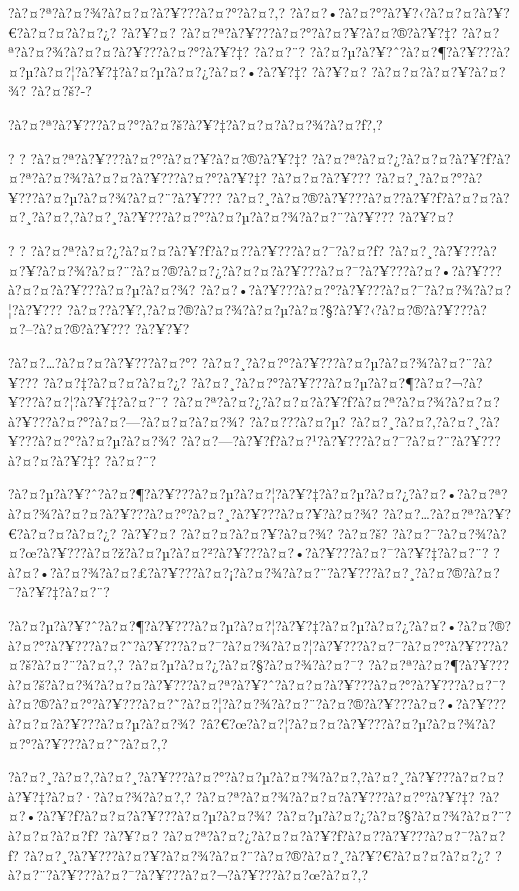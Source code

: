 \documentclass[11pt, openany]{book}
\begin{document}
{{{{{{{{{{{{{{{{?à?¤?ª?à?¤?¾?à?¤?¤?à?¥???à?¤?°?à?¤?‚?
?à?¤?•?à?¤?°?à?¥?‹?à?¤?¤?à?¥?€?à?¤?¤?à?¤?¿? ?à?¥?¤?
?à?¤?ª?à?¥???à?¤?°?à?¤?¥?à?¤?®?à?¥?‡?
?à?¤?ª?à?¤?¾?à?¤?¤?à?¥???à?¤?°?à?¥?‡? ?à?¤?¨?
?à?¤?µ?à?¥?ˆ?à?¤?¶?à?¥???à?¤?µ?à?¤?¦?à?¥?‡?à?¤?µ?à?¤?¿?à?¤?•?à?¥?‡?
?à?¥?¤? ?à?¤?¤?à?¤?¥?à?¤?¾? ?à?¤?š?-?

?à?¤?ª?à?¥???à?¤?°?à?¤?š?à?¥?‡?à?¤?¤?à?¤?¾?à?¤?ƒ?,?

? ? ?à?¤?ª?à?¥???à?¤?°?à?¤?¥?à?¤?®?à?¥?‡?
?à?¤?ª?à?¤?¿?à?¤?¤?à?¥?ƒ?à?¤?ª?à?¤?¾?à?¤?¤?à?¥???à?¤?°?à?¥?‡?
?à?¤?¤?à?¥??? ?à?¤?¸?à?¤?°?à?¥???à?¤?µ?à?¤?¾?à?¤?¨?à?¥???
?à?¤?¸?à?¤?®?à?¥???à?¤?­?à?¥?ƒ?à?¤?¤?à?¤?¸?à?¤?‚?à?¤?¸?à?¥???à?¤?°?à?¤?µ?à?¤?¾?à?¤?¨?à?¥???
?à?¥?¤?

? ? ?à?¤?ª?à?¤?¿?à?¤?¤?à?¥?ƒ?à?¤?­?à?¥???à?¤?¯?à?¤?ƒ?
?à?¤?¸?à?¥???à?¤?¥?à?¤?¾?à?¤?¨?à?¤?®?à?¤?¿?à?¤?¤?à?¥???à?¤?¯?à?¥???à?¤?•?à?¥???à?¤?¤?à?¥???à?¤?µ?à?¤?¾?
?à?¤?•?à?¥???à?¤?°?à?¥???à?¤?¯?à?¤?¾?à?¤?¦?à?¥???
?à?¤?­?à?¥?‚?à?¤?®?à?¤?¾?à?¤?µ?à?¤?§?à?¥?‹?à?¤?®?à?¥???à?¤?--?à?¤?®?à?¥???
?à?¥?¥?

?à?¤?\ldots{}?à?¤?¤?à?¥???à?¤?°?
?à?¤?¸?à?¤?°?à?¥???à?¤?µ?à?¤?¾?à?¤?¨?à?¥??? ?à?¤?‡?à?¤?¤?à?¤?¿?
?à?¤?¸?à?¤?°?à?¥???à?¤?µ?à?¤?¶?à?¤?¬?à?¥???à?¤?¦?à?¥?‡?à?¤?¨?
?à?¤?ª?à?¤?¿?à?¤?¤?à?¥?ƒ?à?¤?ª?à?¤?¾?à?¤?¤?à?¥???à?¤?°?à?¤?---?à?¤?¤?à?¤?¾?
?à?¤???à?¤?µ? ?à?¤?¸?à?¤?‚?à?¤?¸?à?¥???à?¤?°?à?¤?µ?à?¤?¾?
?à?¤?---?à?¥?ƒ?à?¤?¹?à?¥???à?¤?¯?à?¤?¨?à?¥???à?¤?¤?à?¥?‡? ?à?¤?¨?

?à?¤?µ?à?¥?ˆ?à?¤?¶?à?¥???à?¤?µ?à?¤?¦?à?¥?‡?à?¤?µ?à?¤?¿?à?¤?•?à?¤?ª?à?¤?¾?à?¤?¤?à?¥???à?¤?°?à?¤?¸?à?¥???à?¤?¥?à?¤?¾?
?à?¤?\ldots{}?à?¤?ª?à?¥?€?à?¤?¤?à?¤?¿? ?à?¥?¤? ?à?¤?¤?à?¤?¥?à?¤?¾?
?à?¤?š?
?à?¤?¯?à?¤?¾?à?¤?œ?à?¥???à?¤?ž?à?¤?µ?à?¤?²?à?¥???à?¤?•?à?¥???à?¤?¯?à?¥?‡?à?¤?¨?
?à?¤?•?à?¤?¾?à?¤?£?à?¥???à?¤?¡?à?¤?¾?à?¤?¨?à?¥???à?¤?¸?à?¤?®?à?¤?¯?à?¥?‡?à?¤?¨?

?à?¤?µ?à?¥?ˆ?à?¤?¶?à?¥???à?¤?µ?à?¤?¦?à?¥?‡?à?¤?µ?à?¤?¿?à?¤?•?à?¤?®?à?¤?°?à?¥???à?¤?˜?à?¥???à?¤?¯?à?¤?¾?à?¤?¦?à?¥???à?¤?¯?à?¤?°?à?¥???à?¤?š?à?¤?¨?à?¤?‚?
?à?¤?µ?à?¤?¿?à?¤?§?à?¤?¾?à?¤?¯?
?à?¤?ª?à?¤?¶?à?¥???à?¤?š?à?¤?¾?à?¤?¤?à?¥???à?¤?ª?à?¥?ˆ?à?¤?¤?à?¥???à?¤?°?à?¥???à?¤?¯?à?¤?®?à?¤?°?à?¥???à?¤?˜?à?¤?¦?à?¤?¾?à?¤?¨?à?¤?®?à?¥???à?¤?•?à?¥???à?¤?¤?à?¥???à?¤?µ?à?¤?¾?
?â?€?œ?à?¤?¦?à?¤?¤?à?¥???à?¤?µ?à?¤?¾?à?¤?°?à?¥???à?¤?˜?à?¤?‚?

?à?¤?¸?à?¤?‚?à?¤?¸?à?¥???à?¤?°?à?¤?µ?à?¤?¾?à?¤?‚?à?¤?¸?à?¥???à?¤?¤?à?¥?‡?à?¤?·?à?¤?¾?à?¤?‚?
?à?¤?ª?à?¤?¾?à?¤?¤?à?¥???à?¤?°?à?¥?‡?
?à?¤?•?à?¥?ƒ?à?¤?¤?à?¥???à?¤?µ?à?¤?¾?
?à?¤?µ?à?¤?¿?à?¤?§?à?¤?¾?à?¤?¨?à?¤?¤?à?¤?ƒ? ?à?¥?¤?
?à?¤?ª?à?¤?¿?à?¤?¤?à?¥?ƒ?à?¤?­?à?¥???à?¤?¯?à?¤?ƒ?
?à?¤?¸?à?¥???à?¤?¥?à?¤?¾?à?¤?¨?à?¤?®?à?¤?¸?à?¥?€?à?¤?¤?à?¤?¿?
?à?¤?¨?à?¥???à?¤?¯?à?¥???à?¤?¬?à?¥???à?¤?œ?à?¤?‚?

}}}}}}}}}}}}}}}}
\end{document}
